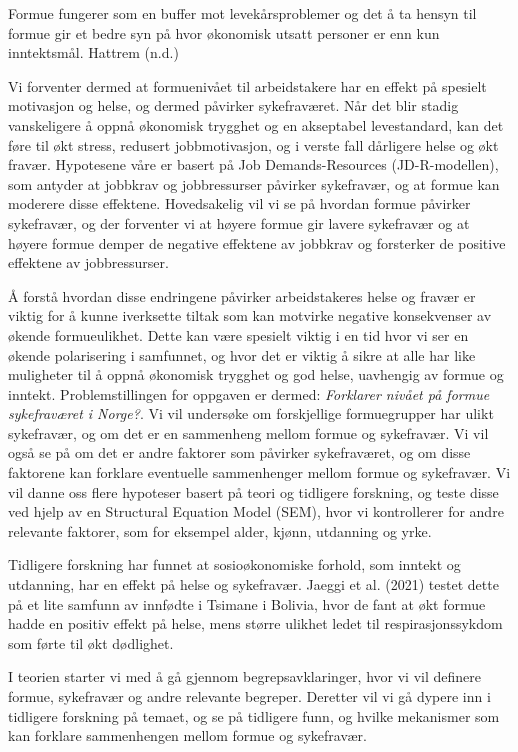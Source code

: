 \documentclass[
  12pt,
  a4paper,
  DIV=11,
  numbers=noendperiod]{scrartcl}
\begin{document}
Formue fungerer som en buffer mot levekårsproblemer og det å ta hensyn
til formue gir et bedre syn på hvor økonomisk utsatt personer er enn kun
inntektsmål. Hattrem (n.d.)

Vi forventer dermed at formuenivået til arbeidstakere har en effekt på
spesielt motivasjon og helse, og dermed påvirker sykefraværet. Når det
blir stadig vanskeligere å oppnå økonomisk trygghet og en akseptabel
levestandard, kan det føre til økt stress, redusert jobbmotivasjon, og i
verste fall dårligere helse og økt fravær. Hypotesene våre er basert på
Job Demands-Resources (JD-R-modellen), som antyder at jobbkrav og
jobbressurser påvirker sykefravær, og at formue kan moderere disse
effektene. Hovedsakelig vil vi se på hvordan formue påvirker sykefravær,
og der forventer vi at høyere formue gir lavere sykefravær og at høyere
formue demper de negative effektene av jobbkrav og forsterker de
positive effektene av jobbressurser.

Å forstå hvordan disse endringene påvirker arbeidstakeres helse og
fravær er viktig for å kunne iverksette tiltak som kan motvirke negative
konsekvenser av økende formueulikhet. Dette kan være spesielt viktig i
en tid hvor vi ser en økende polarisering i samfunnet, og hvor det er
viktig å sikre at alle har like muligheter til å oppnå økonomisk
trygghet og god helse, uavhengig av formue og inntekt. Problemstillingen
for oppgaven er dermed: \emph{Forklarer nivået på formue sykefraværet i
Norge?}. Vi vil undersøke om forskjellige formuegrupper har ulikt
sykefravær, og om det er en sammenheng mellom formue og sykefravær. Vi
vil også se på om det er andre faktorer som påvirker sykefraværet, og om
disse faktorene kan forklare eventuelle sammenhenger mellom formue og
sykefravær. Vi vil danne oss flere hypoteser basert på teori og
tidligere forskning, og teste disse ved hjelp av en Structural Equation
Model (SEM), hvor vi kontrollerer for andre relevante faktorer, som for
eksempel alder, kjønn, utdanning og yrke.

Tidligere forskning har funnet at sosioøkonomiske forhold, som inntekt
og utdanning, har en effekt på helse og sykefravær. Jaeggi et al. (2021)
testet dette på et lite samfunn av innfødte i Tsimane i Bolivia, hvor de
fant at økt formue hadde en positiv effekt på helse, mens større ulikhet
ledet til respirasjonssykdom som førte til økt dødlighet.

I teorien starter vi med å gå gjennom begrepsavklaringer, hvor vi vil
definere formue, sykefravær og andre relevante begreper. Deretter vil vi
gå dypere inn i tidligere forskning på temaet, og se på tidligere funn,
og hvilke mekanismer som kan forklare sammenhengen mellom formue og
sykefravær.
\end{document}
